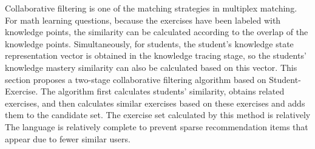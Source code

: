 

Collaborative filtering is one of the matching strategies in multiplex matching. For math learning questions, because the exercises have been labeled with knowledge points, the similarity can be calculated according to the overlap of the knowledge points. Simultaneously, for students, the student's knowledge state representation vector is obtained in the knowledge tracing stage, so the students' knowledge mastery similarity can also be calculated based on this vector. This section proposes a two-stage collaborative filtering algorithm based on Student-Exercise. The algorithm first calculates students' similarity, obtains related exercises, and then calculates similar exercises based on these exercises and adds them to the candidate set. The exercise set calculated by this method is relatively The language is relatively complete to prevent sparse recommendation items that appear due to fewer similar users.

